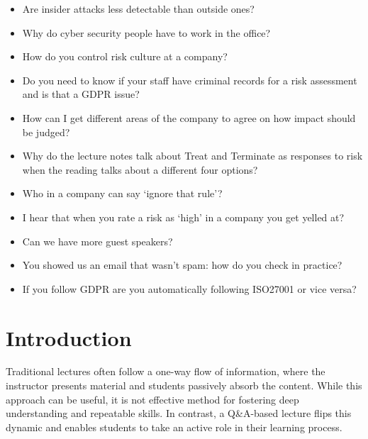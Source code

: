 \documentclass[12pt]{article}
\begin{document}
\begin{itemize}
  \item Are insider attacks less detectable than outside ones?
  \item Why do cyber security people have to work in the office?
  \item How do you control risk culture at a company?
  \item Do you need to know if your staff have criminal records for a risk assessment and is that a GDPR issue?
  \item How can I get different areas of the company to agree on how impact should be judged?
  \item Why do the lecture notes talk about Treat and Terminate as responses to risk when the reading talks about a different four options?
  \item Who in a company can say `ignore that rule'?
  \item I hear that when you rate a risk as `high' in a company you get yelled at?
  \item Can we have more guest speakers?
  \item You showed us an email that wasn't spam: how do you check in practice?
  \item If you follow GDPR are you automatically following ISO27001 or vice versa?
\end{itemize}







\maketitle

\section*{Introduction}

Traditional lectures often follow a one-way flow of information, where the instructor presents material and students passively absorb the content. 
While this approach can be useful, it is not effective method for fostering deep understanding and repeatable skills. In contrast, a Q\&A-based lecture flips this dynamic and enables students to take an active role in their learning process.\cite{reidsema2017flipped} 
\end{document}
